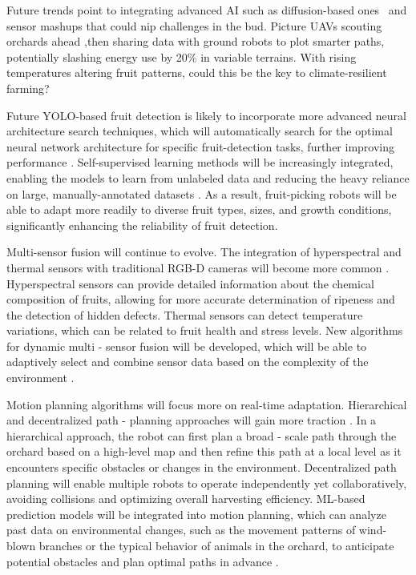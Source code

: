 \documentclass[a4paper,fleqn]{cas-dc}
\begin{document}
 Future trends point to integrating advanced AI such as diffusion-based ones~\cite{heschl2024synthset} and sensor mashups that could nip challenges in the bud. Picture UAVs scouting orchards ahead ,then  sharing data with ground robots to plot smarter paths, potentially slashing energy use by 20\% in variable terrains. With rising temperatures altering fruit patterns, could this be the key to climate-resilient farming?

Future YOLO-based fruit detection is likely to incorporate more advanced neural architecture search techniques, which will automatically search for the optimal neural network architecture for specific fruit-detection tasks, further improving performance \cite{hou2023overview, suresh2023selective}. Self-supervised learning methods will be increasingly integrated, enabling the models to learn from unlabeled data and reducing the heavy reliance on large, manually-annotated datasets \cite{suresh2023selective, zhang2024automatic}. As a result, fruit-picking robots will be able to adapt more readily to diverse fruit types, sizes, and growth conditions, significantly enhancing the reliability of fruit detection.

Multi-sensor fusion will continue to evolve. The integration of hyperspectral and thermal sensors with traditional RGB-D cameras will become more common \cite{mohamed2021smart, martos2021ensuring}. Hyperspectral sensors can provide detailed information about the chemical composition of fruits, allowing for more accurate determination of ripeness and the detection of hidden defects. Thermal sensors can detect temperature variations, which can be related to fruit health and stress levels. New algorithms for dynamic multi - sensor fusion will be developed, which will be able to adaptively select and combine sensor data based on the complexity of the environment \cite{liu2024hierarchical}.

Motion planning algorithms will focus more on real-time adaptation. Hierarchical and decentralized path - planning approaches will gain more traction \cite{lytridis2021overview, li2023multi}. In a hierarchical approach, the robot can first plan a broad - scale path through the orchard based on a high-level map and then refine this path at a local level as it encounters specific obstacles or changes in the environment. Decentralized path planning will enable multiple robots to operate independently yet collaboratively, avoiding collisions and optimizing overall harvesting efficiency. ML-based prediction models will be integrated into motion planning, which can analyze past data on environmental changes, such as the movement patterns of wind-blown branches or the typical behavior of animals in the orchard, to anticipate potential obstacles and plan optimal paths in advance \cite{rajendran2024towards}.
\end{document}
